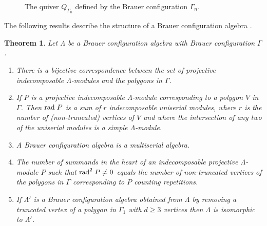 \documentclass[10pt,twoside]{article}
\newcounter{neq}
\newtheorem{teor}{Theorem}
\theoremstyle{definition}
\begin{document}
\begin{figure}[H]
\begin{center}
\caption{The quiver $Q_{\Gamma_{n}}$ defined by the Brauer configuration $\Gamma_{n}$.}
\label{examplebca}
\end{center}
\end{figure}




The following results describe the structure of a Brauer configuration algebra \cite{Green}.

\addtocounter{teor}{3}
\begin{teor}\label{multiserial}
\textit{Let $\Lambda$ be a Brauer configuration algebra with Brauer configuration $\Gamma$}.
\begin{enumerate}
\item \textit{There is a bijective correspondence between the set of projective indecomposable $\Lambda$-modules and the polygons in $\Gamma$}.
\item \textit{If $P$ is a projective indecomposable $\Lambda$-module corresponding to a polygon $V$ in $\Gamma$. Then $\mathrm{rad}\hspace{0.1cm}P$ is a sum of $r$ indecomposable uniserial modules, where $r$ is the number
of (non-truncated) vertices of $V$ and where the intersection of any two of the uniserial modules is a simple $\Lambda$-module}.
\item \textit{A Brauer configuration algebra is a multiserial algebra}.
\item \textit{The number of summands in the heart of an indecomposable projective $\Lambda$-module $P$ such that $\mathrm{rad}^{2}\hspace{0.1cm}P\neq 0$ equals the number of non-truncated vertices of the polygons in $\Gamma$ corresponding to $P$ counting repetitions}.
\item \textit{If $\Lambda'$ is a Brauer configuration algebra obtained from $\Lambda$ by removing a truncated vertex of a polygon in $\Gamma_{1}$ with $d\geq 3$ vertices then $\Lambda$ is isomorphic to $\Lambda'$.}

\end{enumerate}

\end{teor}
\end{document}

